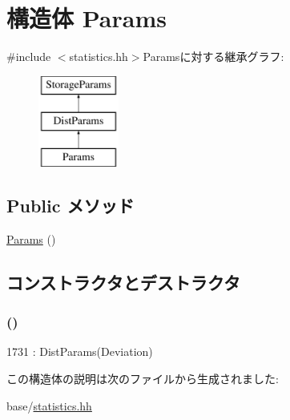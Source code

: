\hypertarget{structStats_1_1AvgSampleStor_1_1Params}{
\section{構造体 Params}
\label{structStats_1_1AvgSampleStor_1_1Params}
}


{\ttfamily \#include $<$statistics.hh$>$}Paramsに対する継承グラフ:\begin{figure}[H]
\begin{center}
\leavevmode
\includegraphics[height=3cm]{structStats_1_1AvgSampleStor_1_1Params}
\end{center}
\end{figure}
\subsection*{Public メソッド}
\begin{DoxyCompactItemize}
\item 
\hyperlink{structStats_1_1AvgSampleStor_1_1Params_a7974597e9d3c848fd265d9445f7cf8cb}{Params} ()
\end{DoxyCompactItemize}


\subsection{コンストラクタとデストラクタ}
\hypertarget{structStats_1_1AvgSampleStor_1_1Params_a7974597e9d3c848fd265d9445f7cf8cb}{
\subsubsection[{Params}]{ ()}}
\label{structStats_1_1AvgSampleStor_1_1Params_a7974597e9d3c848fd265d9445f7cf8cb}



\begin{DoxyCode}
1731 : DistParams(Deviation) {}
\end{DoxyCode}


この構造体の説明は次のファイルから生成されました:\begin{DoxyCompactItemize}
\item 
base/\hyperlink{statistics_8hh}{statistics.hh}\end{DoxyCompactItemize}
